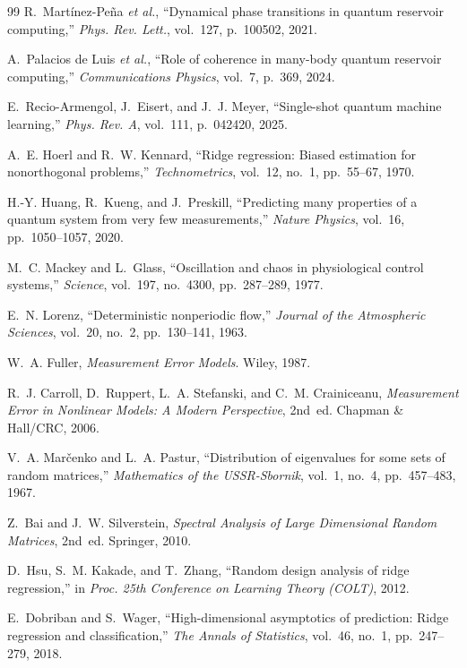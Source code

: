 \begin{thebibliography}{99}
R.~Mart\'inez-Pe\~na \emph{et al.}, ``Dynamical phase transitions in quantum reservoir computing,'' \emph{Phys. Rev. Lett.}, vol.~127, p.~100502, 2021.

A.~Palacios de Luis \emph{et al.}, ``Role of coherence in many-body quantum reservoir computing,'' \emph{Communications Physics}, vol.~7, p.~369, 2024.

E.~Recio-Armengol, J.~Eisert, and J.~J. Meyer, ``Single-shot quantum machine learning,'' \emph{Phys. Rev. A}, vol.~111, p.~042420, 2025.

A.~E. Hoerl and R.~W. Kennard, ``Ridge regression: Biased estimation for nonorthogonal problems,'' \emph{Technometrics}, vol.~12, no.~1, pp.~55--67, 1970.

H.-Y. Huang, R.~Kueng, and J.~Preskill, ``Predicting many properties of a quantum system from very few measurements,'' \emph{Nature Physics}, vol.~16, pp.~1050--1057, 2020.

M.~C. Mackey and L.~Glass, ``Oscillation and chaos in physiological control systems,'' \emph{Science}, vol.~197, no.~4300, pp.~287--289, 1977.

E.~N. Lorenz, ``Deterministic nonperiodic flow,'' \emph{Journal of the Atmospheric Sciences}, vol.~20, no.~2, pp.~130--141, 1963.

W.~A. Fuller, \emph{Measurement Error Models}. Wiley, 1987.

R.~J. Carroll, D.~Ruppert, L.~A. Stefanski, and C.~M. Crainiceanu, \emph{Measurement Error in Nonlinear Models: A Modern Perspective}, 2nd~ed. Chapman \& Hall/CRC, 2006.

V.~A. Mar\v{c}enko and L.~A. Pastur, ``Distribution of eigenvalues for some sets of random matrices,'' \emph{Mathematics of the USSR-Sbornik}, vol.~1, no.~4, pp.~457--483, 1967.

Z.~Bai and J.~W. Silverstein, \emph{Spectral Analysis of Large Dimensional Random Matrices}, 2nd~ed. Springer, 2010.

D.~Hsu, S.~M. Kakade, and T.~Zhang, ``Random design analysis of ridge regression,'' in \emph{Proc. 25th Conference on Learning Theory (COLT)}, 2012.

E.~Dobriban and S.~Wager, ``High-dimensional asymptotics of prediction: Ridge regression and classification,'' \emph{The Annals of Statistics}, vol.~46, no.~1, pp.~247--279, 2018.


\end{thebibliography}
